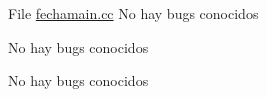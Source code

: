 
\begin{DoxyRefList}
\item[File \mbox{\hyperlink{fechamain_8cc}{fechamain.cc}} ]\label{bug__bug000001}%
%
No hay bugs conocidos 

\label{bug__bug000002}%
%
No hay bugs conocidos 

\label{bug__bug000003}%
%
No hay bugs conocidos 
\end{DoxyRefList}